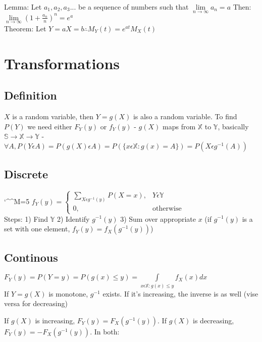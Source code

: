 \documentclass[twocolumn]{article}
\def\disobeylines{\catcode`\^^M=5 } %
\let\Oldint=\int
\let\Oldsum=\sum
\let\Oldlim=\lim
\renewcommand{\int}{\Oldint\limits}
\renewcommand{\sum}{\Oldsum\limits}
\renewcommand{\lim}{\Oldlim\limits}
\begin{document}
Lemma: Let $a_1, a_2, a_3 ...$ be a sequence of numbers such that $\lim_{n \to \infty} a_n = a$
Then: $\lim_{n \to \infty} (1 + \frac{a_n}{n})^n = e^a$\\

Theorem: Let $Y = aX = b \therefore M_Y (t) = e^{at} M_X (t)$

\section*{Transformations}
\subsection*{Definition}
$X$ is a random variable, then $Y = g(X)$ is also a random variable. To find $P(Y)$ we need either $F_Y(y)$ or $f_Y(y)$
- $g(X)$ maps from $\mathbb{X}$ to $\mathbb{Y}$, basically $\mathbb{S} \rightarrow \mathbb{X} \rightarrow \mathbb{Y}$
- $\forall A, P(Y \epsilon A) = P(g(X) \epsilon A) = P(\{x \epsilon \mathbb{X}: g(x) = A\}) = P(X \epsilon g^{-1}(A))$

\subsection*{Discrete}
\disobeylines
\begin{math}
  f_Y(y) = \left\{
    \begin{array}{ll}
      \sum_{X \epsilon g^{-1}(y)} P(X = x), & Y \epsilon \mathbb{Y}\\
      0,                                    & \text{otherwise}
    \end{array}
  \right.
\end{math}
\obeylines\\

Steps:
1) Find $\mathbb{Y}$
2) Identify $g^{-1}(y)$
3) Sum over appropriate $x$ (if $g^{-1}(y)$ is a set with one element, $f_Y(y) = f_X(g^{-1}(y))$)


\subsection*{Continous}
$F_Y(y) = P(Y = y) = P(g(x) \le y) = \int_{x \epsilon \mathbb{X}: g(x) \le y} f_X(x) dx$\\

If $Y = g(X)$ is monotone, $g^{-1}$ exists. If it's increasing, the inverse is as well (vise versa for decreasing)

If $g(X)$ is increasing, $F_Y(y) = F_X(g^{-1}(y))$. If $g(X)$ is decreasing, $F_Y(y) = -F_X(g^{-1}(y))$. In both:\\
\end{document}
